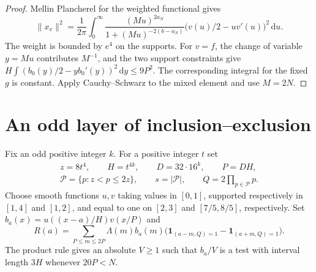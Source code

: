 \documentclass[11pt,a4paper]{article}
\newcommand{\one}{\mathbf 1}
\newcommand{\dd}{\,\mathrm d}
\begin{document}
\begin{proof}
Mellin Plancherel for the weighted functional gives
\[
 \|x_v\|^2=\frac1{2\pi}\int_0^\infty
 \frac{(Mu)^{2a_N}}{1+(Mu)^{-2(b-a_N)}}\bigl(v(u)/2-u v'(u)\bigr)^2\dd u .
\]
The weight is bounded by $e^4$ on the supports. For $v=f$, the change of variable $y=Mu$ contributes $M^{-1}$, and the two support constraints give
$H\int(b_0(y)/2-yb_0'(y))^2\dd y\le9P^2$. The corresponding integral for the fixed $g$ is constant. Apply Cauchy--Schwarz to the mixed element and use $M=2N$.
\end{proof}

\section{An odd layer of inclusion--exclusion}\label{sec:sieve}

Fix an odd positive integer $k$. For a positive integer $t$ set
\[
 \begin{gathered}
 z=8t^4,\qquad H=t^{4k},\qquad D=32\cdot16^k,\qquad P=DH,\\
 \mathcal P=\{p:z<p\le2z\},\qquad s=|\mathcal P|,\qquad Q=2\prod_{p\in\mathcal P}p .
 \end{gathered}
\]
Choose smooth functions $u,v$ taking values in $[0,1]$, supported respectively in $[1,4]$ and $[1,2]$, and equal to one on $[2,3]$ and $[7/5,8/5]$, respectively. Set $b_a(x)=u((x-a)/H)v(x/P)$ and
\[
 R(a)=\sum_{P\le m\le2P}\Lambda(m)b_a(m)
 \bigl(\one_{(a-m,Q)=1}-\one_{(a+m,Q)=1}\bigr).
\]
The product rule gives an absolute $V\ge1$ such that $b_a/V$ is a test with interval length $3H$ whenever $20P<N$.
\end{document}
